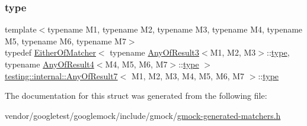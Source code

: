 \subsubsection{\texorpdfstring{type}{type}}
{\footnotesize\ttfamily template$<$typename M1, typename M2, typename M3, typename M4, typename M5, typename M6, typename M7$>$ \\
typedef \hyperlink{classtesting_1_1internal_1_1_either_of_matcher}{Either\+Of\+Matcher}$<$ typename \hyperlink{structtesting_1_1internal_1_1_any_of_result3}{Any\+Of\+Result3}$<$M1, M2, M3$>$\+::\hyperlink{structtesting_1_1internal_1_1_any_of_result7_a976873478921520833464a86f840abe8}{type}, typename \hyperlink{structtesting_1_1internal_1_1_any_of_result4}{Any\+Of\+Result4}$<$M4, M5, M6, M7$>$\+::\hyperlink{structtesting_1_1internal_1_1_any_of_result7_a976873478921520833464a86f840abe8}{type} $>$ \hyperlink{structtesting_1_1internal_1_1_any_of_result7}{testing\+::internal\+::\+Any\+Of\+Result7}$<$ M1, M2, M3, M4, M5, M6, M7 $>$\+::\hyperlink{structtesting_1_1internal_1_1_any_of_result7_a976873478921520833464a86f840abe8}{type}}



The documentation for this struct was generated from the following file\+:\begin{DoxyCompactItemize}
\item 
vendor/googletest/googlemock/include/gmock/\hyperlink{gmock-generated-matchers_8h}{gmock-\/generated-\/matchers.\+h}\end{DoxyCompactItemize}
